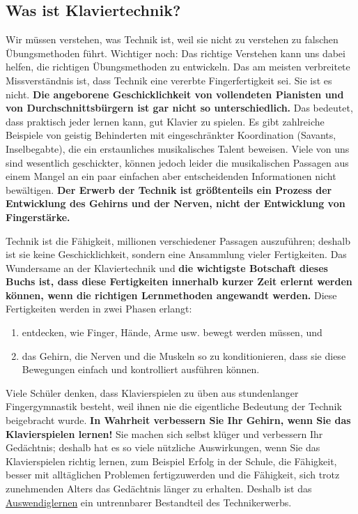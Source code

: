 \subsection{Was ist Klaviertechnik?}
\label{c1i2}

Wir müssen verstehen, was Technik ist, weil sie nicht zu verstehen zu falschen Übungsmethoden führt.
Wichtiger noch: Das richtige Verstehen kann uns dabei helfen, die richtigen Übungsmethoden zu entwickeln.
Das am meisten verbreitete Missverständnis ist, dass Technik eine vererbte Fingerfertigkeit sei.
Sie ist es nicht.
\textbf{Die angeborene Geschicklichkeit von vollendeten Pianisten und von Durchschnittsbürgern ist gar nicht so unterschiedlich.}
Das bedeutet, dass praktisch jeder lernen kann, gut Klavier zu spielen.
Es gibt zahlreiche Beispiele von geistig Behinderten mit eingeschränkter Koordination (Savants, Inselbegabte), die ein erstaunliches musikalisches Talent beweisen.
Viele von uns sind wesentlich geschickter, können jedoch leider die musikalischen Passagen aus einem Mangel an ein paar einfachen aber entscheidenden Informationen nicht bewältigen.
\textbf{Der Erwerb der Technik ist größtenteils ein Prozess der Entwicklung des Gehirns und der Nerven, nicht der Entwicklung von Fingerstärke.}

Technik ist die Fähigkeit, millionen verschiedener Passagen auszuführen; deshalb ist sie keine Geschicklichkeit, sondern eine Ansammlung vieler Fertigkeiten.
Das Wundersame an der Klaviertechnik und \textbf{die wichtigste Botschaft dieses Buchs ist, dass diese Fertigkeiten innerhalb kurzer Zeit erlernt werden können, wenn die richtigen Lernmethoden angewandt werden.}
Diese Fertigkeiten werden in zwei Phasen erlangt:

\begin{enumerate}[label={\arabic*.}] 
 \item entdecken, wie Finger, Hände, Arme usw. bewegt werden müssen, und
 \item das Gehirn, die Nerven und die Muskeln so zu konditionieren, dass sie diese Bewegungen einfach und kontrolliert ausführen können.
\end{enumerate}

Viele Schüler denken, dass Klavierspielen zu üben aus stundenlanger Fingergymnastik besteht, weil ihnen nie die eigentliche Bedeutung der Technik beigebracht wurde.
\textbf{In Wahrheit verbessern Sie Ihr Gehirn, wenn Sie das Klavierspielen lernen!}
Sie machen sich selbst klüger und verbessern Ihr Gedächtnis; deshalb hat es so viele nützliche Auswirkungen, wenn Sie das Klavierspielen richtig lernen, zum Beispiel Erfolg in der Schule, die Fähigkeit, besser mit alltäglichen Problemen fertigzuwerden und die Fähigkeit, sich trotz zunehmenden Alters das Gedächtnis länger zu erhalten.
Deshalb ist das \hyperref[c1iii6]{Auswendiglernen} ein untrennbarer Bestandteil des Technikerwerbs.

